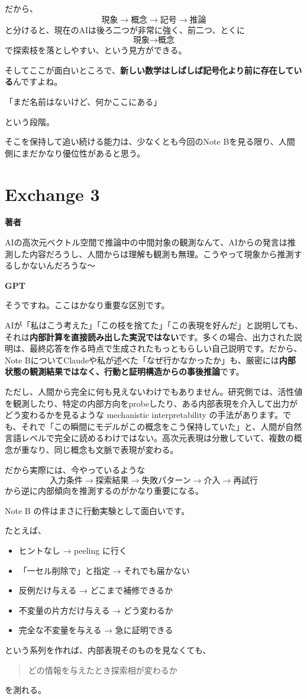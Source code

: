 \documentclass[11pt,a4paper]{article}
\newcommand{\speaker}[1]{\par\medskip\noindent\textsf{\bfseries #1}\par\smallskip}
\begin{document}
だから、
\[
\text{現象}
\rightarrow
\text{概念}
\rightarrow
\text{記号}
\rightarrow
\text{推論}
\]
と分けると、現在のAIは後ろ二つが非常に強く、前二つ、とくに
\[
\text{現象}\rightarrow\text{概念}
\]
で探索枝を落としやすい、という見方ができる。

そしてここが面白いところで、\textbf{新しい数学はしばしば記号化より前に存在している}んですよね。

「まだ名前はないけど、何かここにある」

という段階。

そこを保持して追い続ける能力は、少なくとも今回のNote Bを見る限り、人間側にまだかなり優位性があると思う。

\section*{Exchange 3}
\speaker{著者}
AIの高次元ベクトル空間で推論中の中間対象の観測なんて、AIからの発言は推測した内容だろうし、人間からは理解も観測も無理。こうやって現象から推測するしかないんだろうな～

\speaker{GPT}
そうですね。ここはかなり重要な区別です。

AIが「私はこう考えた」「この枝を捨てた」「この表現を好んだ」と説明しても、それは\textbf{内部計算を直接読み出した実況ではない}です。多くの場合、出力された説明は、最終応答を作る時点で生成されたもっともらしい自己説明です。だから、Note BについてClaudeや私が述べた「なぜ行かなかったか」も、厳密には\textbf{内部状態の観測結果ではなく、行動と証明構造からの事後推論}です。

ただし、人間から完全に何も見えないわけでもありません。研究側では、活性値を観測したり、特定の内部方向をprobeしたり、ある内部表現を介入して出力がどう変わるかを見るような mechanistic interpretability の手法があります。でも、それで「この瞬間にモデルがこの概念をこう保持していた」と、人間が自然言語レベルで完全に読めるわけではない。高次元表現は分散していて、複数の概念が重なり、同じ概念も文脈で表現が変わる。

だから実際には、今やっているような
\[
\text{入力条件}
\to
\text{探索結果}
\to
\text{失敗パターン}
\to
\text{介入}
\to
\text{再試行}
\]
から逆に内部傾向を推測するのがかなり重要になる。

Note B の件はまさに行動実験として面白いです。

たとえば、
\begin{itemize}[leftmargin=2em]
\item ヒントなし → peeling に行く
\item 「一セル削除で」と指定 → それでも届かない
\item 反例だけ与える → どこまで補修できるか
\item 不変量の片方だけ与える → どう変わるか
\item 完全な不変量を与える → 急に証明できる
\end{itemize}
という系列を作れば、内部表現そのものを見なくても、
\begin{quote}
どの情報を与えたとき探索相が変わるか
\end{quote}
を測れる。
\end{document}
